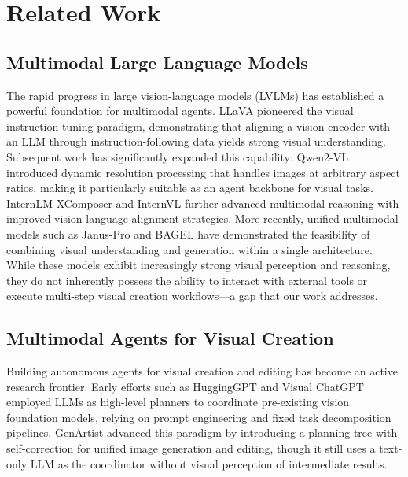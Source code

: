 \documentclass[11pt]{article}
\begin{document}
\section{Related Work}

\subsection{Multimodal Large Language Models}

The rapid progress in large vision-language models (LVLMs) has established a powerful foundation for multimodal agents. LLaVA \cite{liu2023llava} pioneered the visual instruction tuning paradigm, demonstrating that aligning a vision encoder with an LLM through instruction-following data yields strong visual understanding. Subsequent work has significantly expanded this capability: Qwen2-VL \cite{yang2024qwen2vl} introduced dynamic resolution processing that handles images at arbitrary aspect ratios, making it particularly suitable as an agent backbone for visual tasks. InternLM-XComposer \cite{dong2024internlmxcomposer} and InternVL \cite{chen2024internvl} further advanced multimodal reasoning with improved vision-language alignment strategies. More recently, unified multimodal models such as Janus-Pro \cite{chen2025januspro} and BAGEL \cite{deng2025bagel} have demonstrated the feasibility of combining visual understanding and generation within a single architecture. While these models exhibit increasingly strong visual perception and reasoning, they do not inherently possess the ability to interact with external tools or execute multi-step visual creation workflows—a gap that our work addresses.

\subsection{Multimodal Agents for Visual Creation}

Building autonomous agents for visual creation and editing has become an active research frontier. Early efforts such as HuggingGPT \cite{shen2023hugginggpt} and Visual ChatGPT \cite{wu2023visualchatgpt} employed LLMs as high-level planners to coordinate pre-existing vision foundation models, relying on prompt engineering and fixed task decomposition pipelines. GenArtist \cite{zhu2024genartist} advanced this paradigm by introducing a planning tree with self-correction for unified image generation and editing, though it still uses a text-only LLM as the coordinator without visual perception of intermediate results.
\end{document}
